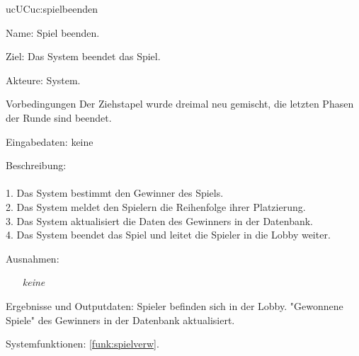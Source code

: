 \begin{description}[leftmargin=5em, style=sameline]
	\begin{lhp}{uc}{UC}{uc:spielbeenden}
		\item [Name:] Spiel beenden.
		\item [Ziel:] Das System beendet das Spiel.
		\item [Akteure:] System.
		\item [Vorbedingungen] Der Ziehstapel wurde dreimal neu gemischt, die letzten Phasen der Runde sind beendet.
		\item [Eingabedaten:] keine
		\item [Beschreibung:] \hfill\\ \hfill\\
			1. Das System bestimmt den Gewinner des Spiels.\\
			2. Das System meldet den Spielern die Reihenfolge ihrer Platzierung.\\
			3. Das System aktualisiert die Daten des Gewinners in der Datenbank.\\
			4. Das System beendet das Spiel und leitet die Spieler in die Lobby weiter.\\
		\item [Ausnahmen:] \hfill
			\begin{itemize} 
				\item[] \textit{keine}
				
			\end{itemize}
		\item [Ergebnisse und Outputdaten:] Spieler befinden sich in der Lobby. "{}Gewonnene Spiele"{} des Gewinners in der Datenbank aktualisiert.
		\item [Systemfunktionen:] \ref{funk:spielverw}.
	\end{lhp}
		
\end{description}